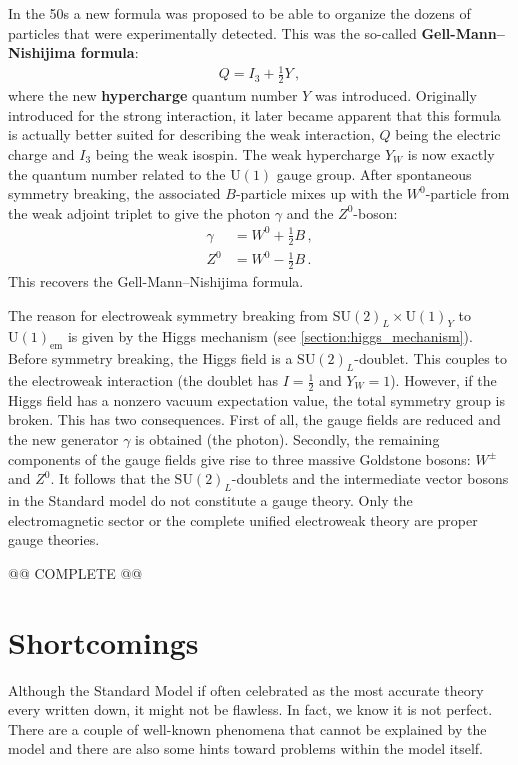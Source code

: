     In the 50s a new formula was proposed to be able to organize the dozens of particles that were experimentally detected. This was the so-called \textbf{Gell-Mann--Nishijima formula}:
    \begin{gather}
        Q = I_3 + \tfrac{1}{2}Y\,,
    \end{gather}
    where the new \textbf{hypercharge} quantum number $Y$ was introduced. Originally introduced for the strong interaction, it later became apparent that this formula is actually better suited for describing the weak interaction, $Q$ being the electric charge and $I_3$ being the weak isospin. The weak hypercharge $Y_W$ is now exactly the quantum number related to the $\mathrm{U}(1)$ gauge group. After spontaneous symmetry breaking, the associated $B$-particle mixes up with the $W^0$-particle from the weak adjoint triplet to give the photon $\gamma$ and the $Z^0$-boson:
    \begin{align}
        \gamma &= W^0 + \tfrac{1}{2}B\,,\\
        Z^0 &= W^0 - \tfrac{1}{2}B\,.
    \end{align}
    This recovers the Gell-Mann--Nishijima formula.

    The reason for electroweak symmetry breaking from $\mathrm{SU}(2)_L\times\mathrm{U}(1)_Y$ to $\mathrm{U}(1)_{\text{em}}$ is given by the Higgs mechanism (see \cref{section:higgs_mechanism}). Before symmetry breaking, the Higgs field is a $\mathrm{SU}(2)_L$-doublet. This couples to the electroweak interaction (the doublet has $I=\tfrac{1}{2}$ and $Y_W=1$). However, if the Higgs field has a nonzero vacuum expectation value, the total symmetry group is broken. This has two consequences. First of all, the gauge fields are reduced and the new generator $\gamma$ is obtained (the photon). Secondly, the remaining components of the gauge fields give rise to three massive Goldstone bosons: $W^\pm$ and $Z^0$. It follows that the $\mathrm{SU}(2)_L$-doublets and the intermediate vector bosons in the Standard model do not constitute a gauge theory. Only the electromagnetic sector or the complete unified electroweak theory are proper gauge theories.

    @@ COMPLETE @@

\section{Shortcomings}

    Although the Standard Model if often celebrated as the most accurate theory every written down, it might not be flawless. In fact, we know it is not perfect. There are a couple of well-known phenomena that cannot be explained by the model and there are also some hints toward problems within the model itself.

